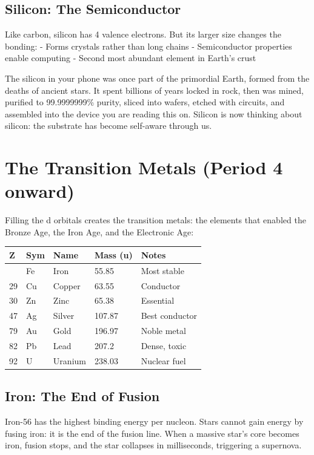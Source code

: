 \documentclass[
  11pt,
  letterpaper,
  twoside,
  openright]{book}
\begin{document}
\subsection{Silicon: The Semiconductor}\label{silicon-the-semiconductor}

Like carbon, silicon has 4 valence electrons. But its larger size
changes the bonding: - Forms crystals rather than long chains -
Semiconductor properties enable computing - Second most abundant element
in Earth's crust

The silicon in your phone was once part of the primordial Earth, formed
from the deaths of ancient stars. It spent billions of years locked in
rock, then was mined, purified to 99.9999999\% purity, sliced into
wafers, etched with circuits, and assembled into the device you are
reading this on. Silicon is now thinking about silicon: the substrate
has become self-aware through us.

\section{The Transition Metals (Period 4
onward)}\label{the-transition-metals-period-4-onward}

Filling the d orbitals creates the transition metals: the elements that
enabled the Bronze Age, the Iron Age, and the Electronic Age:

\begin{longtable}[]{@{}lllll@{}}
\toprule\noalign{}
Z & Sym & Name & Mass (u) & Notes \\
\midrule\noalign{}
\endhead
\bottomrule\noalign{}
\endlastfoot
26 & Fe & Iron & 55.85 & Most stable \\
29 & Cu & Copper & 63.55 & Conductor \\
30 & Zn & Zinc & 65.38 & Essential \\
47 & Ag & Silver & 107.87 & Best conductor \\
79 & Au & Gold & 196.97 & Noble metal \\
82 & Pb & Lead & 207.2 & Dense, toxic \\
92 & U & Uranium & 238.03 & Nuclear fuel \\
\end{longtable}

\subsection{Iron: The End of Fusion}\label{iron-the-end-of-fusion}

Iron-56 has the highest binding energy per nucleon. Stars cannot gain
energy by fusing iron: it is the end of the fusion line. When a massive
star's core becomes iron, fusion stops, and the star collapses in
milliseconds, triggering a supernova.
\end{document}
